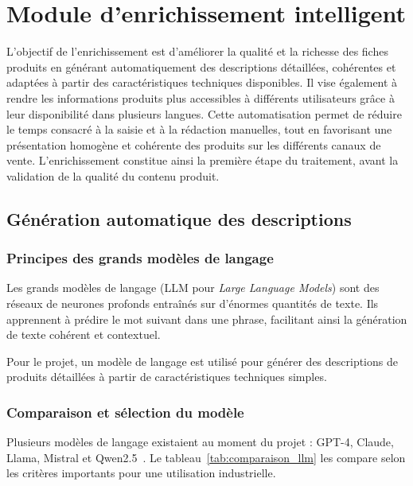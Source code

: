 \section{Module d'enrichissement intelligent}

L'objectif de l'enrichissement est d'améliorer la qualité et la richesse des fiches produits en générant automatiquement des descriptions détaillées, cohérentes et adaptées à partir des caractéristiques techniques disponibles. Il vise également à rendre les informations produits plus accessibles à différents utilisateurs grâce à leur disponibilité dans plusieurs langues. Cette automatisation permet de réduire le temps consacré à la saisie et à la rédaction manuelles, tout en favorisant une présentation homogène et cohérente des produits sur les différents canaux de vente. L'enrichissement constitue ainsi la première étape du traitement, avant la validation de la qualité du contenu produit.

\subsection{Génération automatique des descriptions}

\subsubsection{Principes des grands modèles de langage}

Les grands modèles de langage (LLM pour \textit{Large Language Models}) sont des réseaux de neurones profonds entraînés sur d'énormes quantités de texte. Ils apprennent à prédire le mot suivant dans une phrase, facilitant ainsi la génération de texte cohérent et contextuel.

Pour le projet, un modèle de langage est utilisé pour générer des descriptions de produits détaillées à partir de caractéristiques techniques simples.

\subsubsection{Comparaison et sélection du modèle}

Plusieurs modèles de langage existaient au moment du projet : GPT-4, Claude, Llama, Mistral et Qwen2.5~. Le tableau~\ref{tab:comparaison_llm} les compare selon les critères importants pour une utilisation industrielle.

